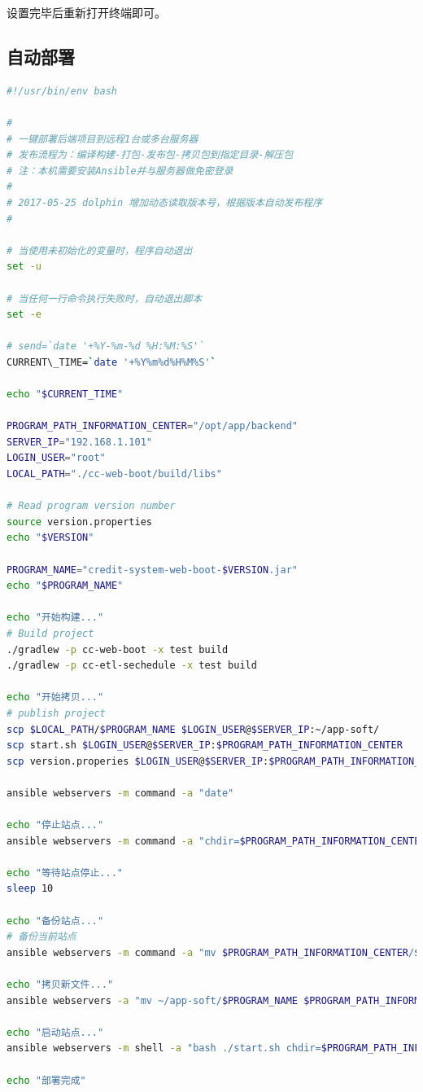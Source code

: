 \documentclass[letter]{book}
\begin{document}
设置完毕后重新打开终端即可。

\subsection{自动部署}

\begin{lstlisting}[language=Bash]
#!/usr/bin/env bash

#
# 一键部署后端项目到远程1台或多台服务器
# 发布流程为：编译构建-打包-发布包-拷贝包到指定目录-解压包
# 注：本机需要安装Ansible并与服务器做免密登录
#
# 2017-05-25 dolphin 增加动态读取版本号，根据版本自动发布程序
#

# 当使用未初始化的变量时，程序自动退出
set -u

# 当任何一行命令执行失败时，自动退出脚本
set -e

# send=`date '+%Y-%m-%d %H:%M:%S'`
CURRENT\_TIME=`date '+%Y%m%d%H%M%S'`

echo "$CURRENT_TIME"

PROGRAM_PATH_INFORMATION_CENTER="/opt/app/backend"
SERVER_IP="192.168.1.101"
LOGIN_USER="root"
LOCAL_PATH="./cc-web-boot/build/libs"

# Read program version number
source version.properties
echo "$VERSION"

PROGRAM_NAME="credit-system-web-boot-$VERSION.jar"
echo "$PROGRAM_NAME"

echo "开始构建..."
# Build project
./gradlew -p cc-web-boot -x test build
./gradlew -p cc-etl-sechedule -x test build

echo "开始拷贝..."
# publish project
scp $LOCAL_PATH/$PROGRAM_NAME $LOGIN_USER@$SERVER_IP:~/app-soft/
scp start.sh $LOGIN_USER@$SERVER_IP:$PROGRAM_PATH_INFORMATION_CENTER
scp version.properies $LOGIN_USER@$SERVER_IP:$PROGRAM_PATH_INFORMATION_CENTER

ansible webservers -m command -a "date"

echo "停止站点..."
ansible webservers -m command -a "chdir=$PROGRAM_PATH_INFORMATION_CENTER bash ./stop.sh"

echo "等待站点停止..."
sleep 10

echo "备份站点..."
# 备份当前站点
ansible webservers -m command -a "mv $PROGRAM_PATH_INFORMATION_CENTER/$PROGRAM_NAME $PROGRAM_PATH_INFORMATION_CENTER/$PROGRAM_NAME-$CURRENT_TIME"

echo "拷贝新文件..."
ansible webservers -a "mv ~/app-soft/$PROGRAM_NAME $PROGRAM_PATH_INFORMATION_CENTER"

echo "启动站点..."
ansible webservers -m shell -a "bash ./start.sh chdir=$PROGRAM_PATH_INFORMATION_CENTER"

echo "部署完成"
\end{lstlisting}
\end{document}
